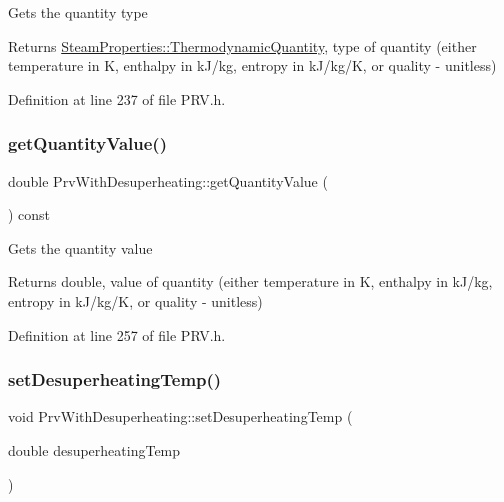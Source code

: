 Gets the quantity type

\begin{DoxyReturn}{Returns}
\hyperlink{class_steam_properties_ae0294bedf7d178c2d8fb6aed0f62fbff}{Steam\+Properties\+::\+Thermodynamic\+Quantity}, type of quantity (either temperature in K, enthalpy in k\+J/kg, entropy in k\+J/kg/K, or quality -\/ unitless) 
\end{DoxyReturn}


Definition at line 237 of file P\+R\+V.\+h.

\mbox{\label{class_prv_with_desuperheating_a6a2c13b37e09ae4eddbbb5dae7801b0e}} 
\subsubsection{\texorpdfstring{get\+Quantity\+Value()}{getQuantityValue()}}
{\footnotesize\ttfamily double Prv\+With\+Desuperheating\+::get\+Quantity\+Value (\begin{DoxyParamCaption}{ }\end{DoxyParamCaption}) const\hspace{0.3cm}{\ttfamily [inline]}}

Gets the quantity value

\begin{DoxyReturn}{Returns}
double, value of quantity (either temperature in K, enthalpy in k\+J/kg, entropy in k\+J/kg/K, or quality -\/ unitless) 
\end{DoxyReturn}


Definition at line 257 of file P\+R\+V.\+h.

\mbox{\label{class_prv_with_desuperheating_ade1b153c495efb451006b3c054ff386e}} 
\subsubsection{\texorpdfstring{set\+Desuperheating\+Temp()}{setDesuperheatingTemp()}}
{\footnotesize\ttfamily void Prv\+With\+Desuperheating\+::set\+Desuperheating\+Temp (\begin{DoxyParamCaption}\item[{double}]{desuperheating\+Temp }\end{DoxyParamCaption})\hspace{0.3cm}{\ttfamily [inline]}}

